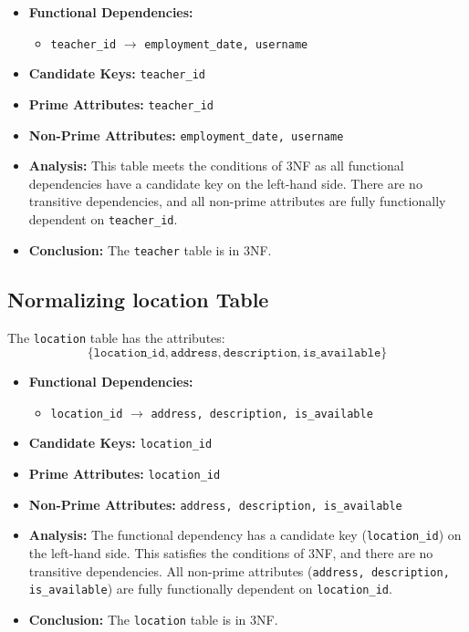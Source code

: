 \begin{itemize}
    \item \textbf{Functional Dependencies:}
    \begin{itemize}
        \item \texttt{teacher\_id} $\rightarrow$ \texttt{employment\_date, username}
    \end{itemize}

    \item \textbf{Candidate Keys:} \texttt{teacher\_id}

    \item \textbf{Prime Attributes:} \texttt{teacher\_id}

    \item \textbf{Non-Prime Attributes:} \texttt{employment\_date, username}

    \item \textbf{Analysis:} This table meets the conditions of 3NF as all functional dependencies have a candidate key on the left-hand side. There are no transitive dependencies, and all non-prime attributes are fully functionally dependent on \texttt{teacher\_id}.

    \item \textbf{Conclusion:} The \texttt{teacher} table is in 3NF.
\end{itemize}

\subsection{Normalizing location Table}

The \texttt{location} table has the attributes:
\[
\{ \texttt{location\_id}, \texttt{address}, \texttt{description}, \texttt{is\_available} \}
\]

\begin{itemize}
    \item \textbf{Functional Dependencies:}
    \begin{itemize}
        \item \texttt{location\_id} $\rightarrow$ \texttt{address, description, is\_available}
    \end{itemize}

    \item \textbf{Candidate Keys:} \texttt{location\_id}

    \item \textbf{Prime Attributes:} \texttt{location\_id}

    \item \textbf{Non-Prime Attributes:} \texttt{address, description, is\_available}

    \item \textbf{Analysis:} The functional dependency has a candidate key (\texttt{location\_id}) on the left-hand side. This satisfies the conditions of 3NF, and there are no transitive dependencies. All non-prime attributes (\texttt{address, description, is\_available}) are fully functionally dependent on \texttt{location\_id}.

    \item \textbf{Conclusion:} The \texttt{location} table is in 3NF.
\end{itemize}

